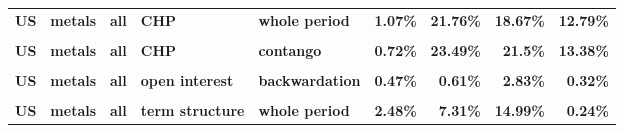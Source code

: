 \documentclass[
  authoryear,
  preprint,
  3p]{elsarticle}
\begin{document}
\begin{landscape}
\begin{longtable}[t]{>{}l>{}l>{}l>{}l>{}l>{}r>{}r>{}r>{}r}
\textbf{US} & \textbf{metals} & \textbf{all} & \textbf{CHP} & \textbf{whole period} & \textcolor[HTML]{4285f4}{\textbf{1.07\%}} & \textcolor[HTML]{4285f4}{\textbf{21.76\%}} & \textcolor[HTML]{4285f4}{\textbf{18.67\%}} & \textcolor[HTML]{4285f4}{\textbf{12.79\%}}\\
\textbf{\cellcolor{gray!10}{US}} & \textbf{\cellcolor{gray!10}{metals}} & \textbf{\cellcolor{gray!10}{all}} & \textbf{\cellcolor{gray!10}{CHP}} & \textbf{\cellcolor{gray!10}{backwardation}} & \textcolor[HTML]{4285f4}{\textbf{\cellcolor{gray!10}{1.66\%}}} & \textcolor[HTML]{4285f4}{\textbf{\cellcolor{gray!10}{20.33\%}}} & \textcolor[HTML]{4285f4}{\textbf{\cellcolor{gray!10}{15.15\%}}} & \textcolor[HTML]{4285f4}{\textbf{\cellcolor{gray!10}{12.71\%}}}\\
\textbf{US} & \textbf{metals} & \textbf{all} & \textbf{CHP} & \textbf{contango} & \textcolor[HTML]{4285f4}{\textbf{0.72\%}} & \textcolor[HTML]{4285f4}{\textbf{23.49\%}} & \textcolor[HTML]{4285f4}{\textbf{21.5\%}} & \textcolor[HTML]{4285f4}{\textbf{13.38\%}}\\
\textbf{\cellcolor{gray!10}{US}} & \textbf{\cellcolor{gray!10}{metals}} & \textbf{\cellcolor{gray!10}{all}} & \textbf{\cellcolor{gray!10}{open interest}} & \textbf{\cellcolor{gray!10}{whole period}} & \textcolor[HTML]{4285f4}{\textbf{\cellcolor{gray!10}{0.5\%}}} & \textcolor[HTML]{4285f4}{\textbf{\cellcolor{gray!10}{0.91\%}}} & \textcolor[HTML]{4285f4}{\textbf{\cellcolor{gray!10}{3.68\%}}} & \textcolor[HTML]{4285f4}{\textbf{\cellcolor{gray!10}{0.27\%}}}\\
\addlinespace
\textbf{US} & \textbf{metals} & \textbf{all} & \textbf{open interest} & \textbf{backwardation} & \textcolor[HTML]{4285f4}{\textbf{0.47\%}} & \textcolor[HTML]{4285f4}{\textbf{0.61\%}} & \textcolor[HTML]{4285f4}{\textbf{2.83\%}} & \textcolor[HTML]{4285f4}{\textbf{0.32\%}}\\
\textbf{\cellcolor{gray!10}{US}} & \textbf{\cellcolor{gray!10}{metals}} & \textbf{\cellcolor{gray!10}{all}} & \textbf{\cellcolor{gray!10}{open interest}} & \textbf{\cellcolor{gray!10}{contango}} & \textcolor[HTML]{4285f4}{\textbf{\cellcolor{gray!10}{0.61\%}}} & \textcolor[HTML]{4285f4}{\textbf{\cellcolor{gray!10}{1.28\%}}} & \textcolor[HTML]{4285f4}{\textbf{\cellcolor{gray!10}{4.31\%}}} & \textcolor[HTML]{4285f4}{\textbf{\cellcolor{gray!10}{0.24\%}}}\\
\textbf{US} & \textbf{metals} & \textbf{all} & \textbf{term structure} & \textbf{whole period} & \textcolor[HTML]{4285f4}{\textbf{2.48\%}} & \textcolor[HTML]{4285f4}{\textbf{7.31\%}} & \textcolor[HTML]{4285f4}{\textbf{14.99\%}} & \textcolor[HTML]{4285f4}{\textbf{0.24\%}}\\

\end{longtable}
\end{landscape}
\end{document}
